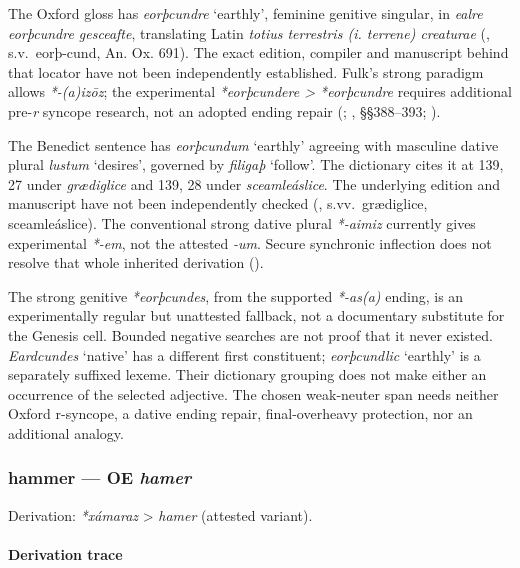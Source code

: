 \documentclass[
  british,
  a4paper,
]{article}
\begin{document}
The Oxford gloss has \emph{eorþcundre} `earthly', feminine genitive
singular, in \emph{ealre eorþcundre gesceafte}, translating Latin
\emph{totius terrestris (i. terrene) creaturae}
(, s.v.~eorþ-cund, An. Ox. 691).
The exact edition, compiler and manuscript behind that locator have not
been independently established. Fulk's strong paradigm allows
\emph{*-(a)izōz}; the experimental \emph{*eorþcundere > *eorþcundre}
requires additional pre-\emph{r} syncope research, not an adopted ending
repair (;
, §§388--393;
).

The Benedict sentence has \emph{eorþcundum} `earthly' agreeing with
masculine dative plural \emph{lustum} `desires', governed by
\emph{filigaþ} `follow'. The dictionary cites it at 139, 27 under
\emph{grædiglice} and 139, 28 under \emph{sceamleáslice}. The underlying
edition and manuscript have not been independently checked
(, s.vv.~grædiglice,
sceamleáslice). The conventional strong dative plural \emph{*-aimiz}
currently gives experimental \emph{*-em}, not the attested \emph{-um}.
Secure synchronic inflection does not resolve that whole inherited
derivation ().

The strong genitive \emph{*eorþcundes}, from the supported
\emph{*-as(a)} ending, is an experimentally regular but unattested
fallback, not a documentary substitute for the Genesis cell. Bounded
negative searches are not proof that it never existed. \emph{Eardcundes}
`native' has a different first constituent; \emph{eorþcundlic} `earthly'
is a separately suffixed lexeme. Their dictionary grouping does not make
either an occurrence of the selected adjective. The chosen weak-neuter
span needs neither Oxford r-syncope, a dative ending repair,
final-overheavy protection, nor an additional analogy.

\subsubsection{\texorpdfstring{hammer --- OE
\emph{hamer}}{hammer --- OE hamer}}\label{hammer-oe-hamer}

Derivation: \emph{*xámaraz} \textgreater{} \emph{hamer} (attested
variant).

\paragraph{Derivation trace}\label{derivation-trace-107}
\end{document}

